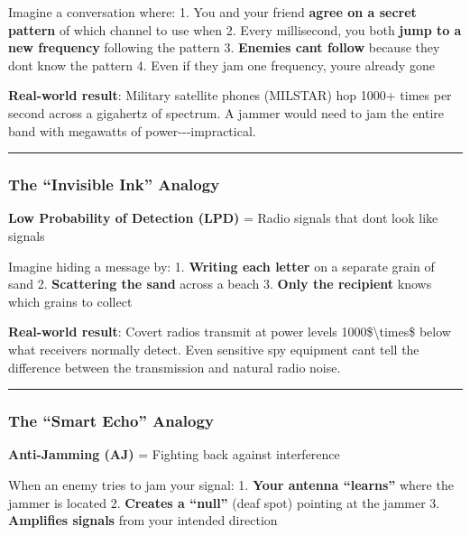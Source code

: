 Imagine a conversation where: 1. You and your friend \textbf{agree on a
secret pattern} of which channel to use when 2. Every millisecond, you
both \textbf{jump to a new frequency} following the pattern 3.
\textbf{Enemies can\textquotesingle t follow} because they
don\textquotesingle t know the pattern 4. Even if they jam one
frequency, you\textquotesingle re already gone

\textbf{Real-world result}: Military satellite phones (MILSTAR) hop
1000+ times per second across a gigahertz of spectrum. A jammer would
need to jam the entire band with megawatts of power-\/-\/-impractical.

\begin{center}\rule{0.5\linewidth}{0.5pt}\end{center}

\subsubsection{The ``Invisible Ink''
Analogy}\label{the-invisible-ink-analogy}

\textbf{Low Probability of Detection (LPD)} = Radio signals that
don\textquotesingle t look like signals

Imagine hiding a message by: 1. \textbf{Writing each letter} on a
separate grain of sand 2. \textbf{Scattering the sand} across a beach 3.
\textbf{Only the recipient} knows which grains to collect

\textbf{Real-world result}: Covert radios transmit at power levels
1000\$\textbackslash times\$ below what receivers normally detect. Even
sensitive spy equipment can\textquotesingle t tell the difference
between the transmission and natural radio noise.

\begin{center}\rule{0.5\linewidth}{0.5pt}\end{center}

\subsubsection{The ``Smart Echo'' Analogy}\label{the-smart-echo-analogy}

\textbf{Anti-Jamming (AJ)} = Fighting back against interference

When an enemy tries to jam your signal: 1. \textbf{Your antenna
``learns''} where the jammer is located 2. \textbf{Creates a ``null''}
(deaf spot) pointing at the jammer 3. \textbf{Amplifies signals} from
your intended direction

